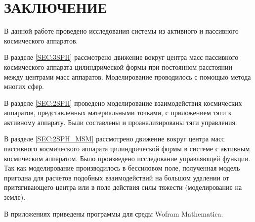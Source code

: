 \section*{ЗАКЛЮЧЕНИЕ}

В данной работе проведено исследования системы из активного и пассивного космического аппаратов.

В разделе \ref{SEC:3SPH} рассмотрено движение вокруг центра масс пассивного космического аппарата цилиндрической формы при постоянном расстоянии между центрами масс аппаратов. Моделирование проводилось с помощью метода многих сфер.

В разделе \ref{SEC:2SPH} проведено моделирование взаимодействия космических аппаратов, представленных материальными точками, с приложением тяги к активному аппарату. Были составлены и проанализированы тяги управления.

В разделе \ref{SEC:2SPH_MSM} рассмотрено движение вокруг центра масс пассивного космического аппарата цилиндрической формы в системе с активным космическим аппаратом. Было произведено исследование управляющей функции. Так как моделирование производилось в бессиловом поле, полученная модель пригодна для расчетов подобных взаимодействий на большом удалении от притягивающего центра или в поле действия силы тяжести (моделирование на земле).

В приложениях приведены программы для среды Wofram Mathematica.